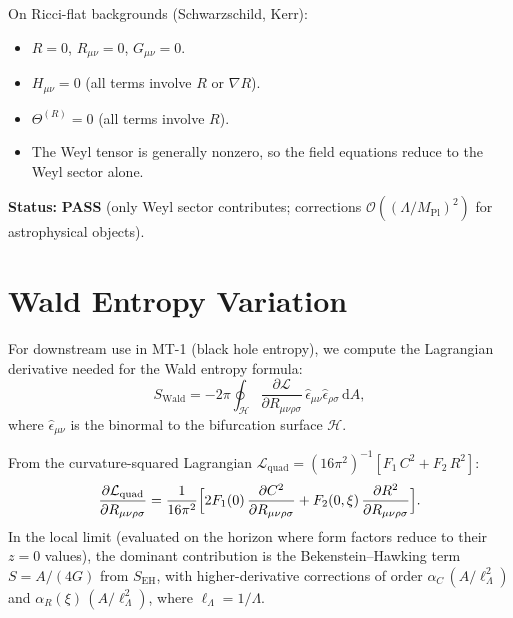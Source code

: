 \documentclass[11pt,a4paper]{article}
\renewcommand{\dd}{\mathrm{d}}
\theoremstyle{plain}
\theoremstyle{definition}
\begin{document}
On Ricci-flat backgrounds (Schwarzschild, Kerr):
\begin{itemize}[nosep]
  \item $R = 0$, $R_{\mu\nu} = 0$, $G_{\mu\nu} = 0$.
  \item $H_{\mu\nu} = 0$ (all terms involve $R$ or $\nabla R$).
  \item $\Theta^{(R)} = 0$ (all terms involve $R$).
  \item The Weyl tensor is generally nonzero, so the field equations
    reduce to the Weyl sector alone.
\end{itemize}

\noindent\textbf{Status:} \textcolor{green!50!black}{\textbf{PASS}}
(only Weyl sector contributes; corrections
$\mathcal{O}((\Lambda/M_{\mathrm{Pl}})^2)$ for astrophysical objects).

\section{Wald Entropy Variation}\label{sec:wald}

For downstream use in MT-1 (black hole entropy), we compute the
Lagrangian derivative needed for the Wald entropy formula:
\begin{equation}\label{eq:wald}
  S_{\mathrm{Wald}} = -2\pi\oint_{\mathcal{H}}
  \frac{\partial\mathcal{L}}{\partial R_{\mu\nu\rho\sigma}}\,
  \hat{\epsilon}_{\mu\nu}\hat{\epsilon}_{\rho\sigma}\,\dd A,
\end{equation}
where $\hat{\epsilon}_{\mu\nu}$ is the binormal to the bifurcation
surface $\mathcal{H}$.

From the curvature-squared Lagrangian
$\mathcal{L}_{\mathrm{quad}} = (16\pi^2)^{-1}[F_1\,C^2 + F_2\,R^2]$:
\begin{equation}\label{eq:wald-variation}
  \frac{\partial\mathcal{L}_{\mathrm{quad}}}{\partial R_{\mu\nu\rho\sigma}}
  = \frac{1}{16\pi^2}\Bigl[
    2F_1(0)\,\frac{\partial C^2}{\partial R_{\mu\nu\rho\sigma}}
    + F_2(0,\xi)\,\frac{\partial R^2}{\partial R_{\mu\nu\rho\sigma}}
  \Bigr].
\end{equation}
In the local limit (evaluated on the horizon where form factors reduce
to their $z = 0$ values), the dominant contribution is the
Bekenstein--Hawking term $S = A/(4G)$ from $S_{\mathrm{EH}}$, with
higher-derivative corrections of order $\alpha_C\,(A/\ell_\Lambda^2)$
and $\alpha_R(\xi)\,(A/\ell_\Lambda^2)$, where $\ell_\Lambda = 1/\Lambda$.
\end{document}
